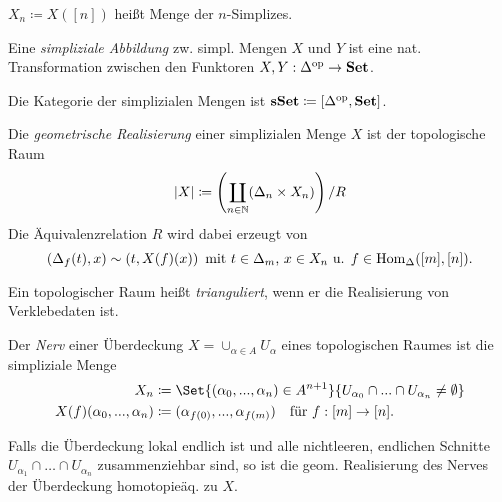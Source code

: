 \documentclass{cheat-sheet}
\begin{document}
\begin{nota}
  $X_n \coloneqq X([n])$ heißt Menge der $n$-Simplizes.
\end{nota}

\begin{defn}
  Eine \emph{simpliziale Abbildung} zw. simpl. Mengen $X$ und $Y$ ist eine nat. Transformation zwischen den Funktoren $X, Y : \Delta^{\mathrm{op}} \to \mathbf{Set}$.
\end{defn}

\begin{defn}
  Die Kategorie der simplizialen Mengen ist $\mathbf{sSet} \coloneqq [\Delta^{\mathrm{op}}, \mathbf{Set}]$.
\end{defn}

\begin{defn}
  Die \emph{geometrische Realisierung} einer simplizialen Menge $X$ ist der topologische Raum
  \[ \lvert X\rvert \coloneqq \left( \coprod_{n \in \mathbb{N}} (\Delta_n \times X_{n}) \right) / R \]
  Die Äquivalenzrelation $R$ wird dabei erzeugt von
  \[
    (\Delta_f(t), x) \sim (t, X(f)(x)) \enspace
    \text{mit $t \in \Delta_m$, $x \in X_n$ u. $f \in \operatorname{Hom}_\Delta([m], [n])$.}
  \]
\end{defn}

\begin{defn}
  Ein topologischer Raum heißt \emph{trianguliert}, wenn er die Realisierung von Verklebedaten ist.
\end{defn}

\begin{defn}
  Der \emph{Nerv} einer Überdeckung $X = \cup_{\alpha \in A} U_\alpha$ eines topologischen Raumes ist die simpliziale Menge
  \begin{align*}
    X_n & \coloneqq \Set{(\alpha_0, \nldots, \alpha_n) \in A^{n+1}}{ U_{\alpha_0} \cap \nldots \cap U_{\alpha_n} \not= \emptyset } \\
    X(f)(\alpha_0, \nldots, \alpha_n) & \coloneqq (\alpha_{f(0)}, \nldots, \alpha_{f(m)}) \quad \text{für } f : [m] \to [n].
  \end{align*}
\end{defn}

\begin{bem}
  Falls die Überdeckung lokal endlich ist und alle nichtleeren, endlichen Schnitte $U_{\alpha_1} \cap \ldots \cap U_{\alpha_n}$ zusammenziehbar sind, so ist die geom. Realisierung des Nerves der Überdeckung homotopieäq. zu $X$.
\end{bem}
\end{document}
